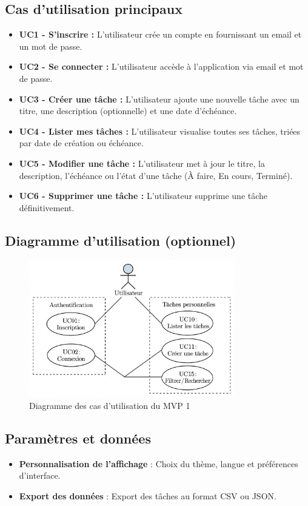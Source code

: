 \subsection{Cas d’utilisation principaux}
\begin{itemize}
	\item \textbf{UC1 - S’inscrire :} L’utilisateur crée un compte en fournissant un email et un mot de passe.
	\item \textbf{UC2 - Se connecter :} L’utilisateur accède à l’application via email et mot de passe. 
	\item \textbf{UC3 - Créer une tâche :} L’utilisateur ajoute une nouvelle tâche avec un titre, une description (optionnelle) et une date d’échéance.
	\item \textbf{UC4 - Lister mes tâches :} L’utilisateur visualise toutes ses tâches, triées par date de création ou échéance.
	\item \textbf{UC5 - Modifier une tâche :} L’utilisateur met à jour le titre, la description, l’échéance ou l’état d’une tâche (À faire, En cours, Terminé).
	\item \textbf{UC6 - Supprimer une tâche :} L’utilisateur supprime une tâche définitivement.
\end{itemize}

\subsection{Diagramme d’utilisation (optionnel)}
\begin{figure}[H]
	\centering
	\includegraphics[width=0.8\textwidth]{images/diagram_use_cases.png}
	\caption{Diagramme des cas d’utilisation du MVP 1}
\end{figure}

\subsection{Paramètres et données}
\begin{itemize}
	\item \textbf{Personnalisation de l’affichage} : Choix du thème, langue et préférences d’interface.
	\item \textbf{Export des données} : Export des tâches au format CSV ou JSON.
\end{itemize}

